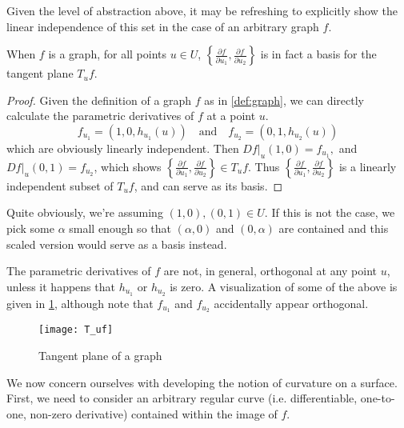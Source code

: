 Given the level of abstraction above, it may be refreshing to explicitly show the linear independence of this set in the case of an arbitrary graph $f$.
\begin{lemma} \label{lemma:f_ui-is-a-basis}
	When $f$ is a graph, for all points $u \in U$, $\left\{\frac{\partial f}{\partial u_1} , \frac{\partial f}{\partial u_2}\right\}$ is in fact a basis for the tangent plane $T_uf$.
\end{lemma}

\begin{proof}
Given the definition of a graph $f$ as in \cref{def:graph}, we can directly calculate the parametric derivatives of $f$ at a point $u$.
\[
f_{u_1} = (1,0,h_{u_1}(u)) \quad\textrm{and}\quad f_{u_2} = (0,1,h_{u_2}(u))
\]
 which are obviously linearly independent.  Then $Df\vert_u (1,0) = f_{u_1} ,$ and $ Df\vert_u (0,1) = f_{u_2}$, which shows $\left\{\frac{\partial f}{\partial u_1} , \frac{\partial f}{\partial u_2}\right\} \in T_uf$.  Thus $\left\{\frac{\partial f}{\partial u_1} , \frac{\partial f}{\partial u_2}\right\}$ is a linearly independent subset of $T_u f$, and can serve as its basis.\end{proof}

Quite obviously, we're assuming $(1,0), (0,1) \in U$. If this is not the case, we pick some $\alpha$ small enough so that $(\alpha,0)$ and $(0,\alpha)$ are contained and this scaled version would serve as a basis instead.

	The parametric derivatives of $f$ are not, in general, orthogonal at any point $u$, unless it happens that $h_{u_1} $ or $h_{u_2}$ is zero.
	A visualization of some of the above is given in \cref{fig:Tuf}, although note that $f_{u_1}$ and  $f_{u_2}$ accidentally appear orthogonal.
	
	\begin{figure}\centering
		\texttt{[image: T\_uf]}
		\caption{Tangent plane of a graph}
		\label{fig:Tuf} 
	\end{figure}

We now concern ourselves with developing the notion of curvature on a surface. First, we need to consider an arbitrary regular curve (i.e. differentiable, one-to-one, non-zero derivative) contained within the image of $f$. 
  	

